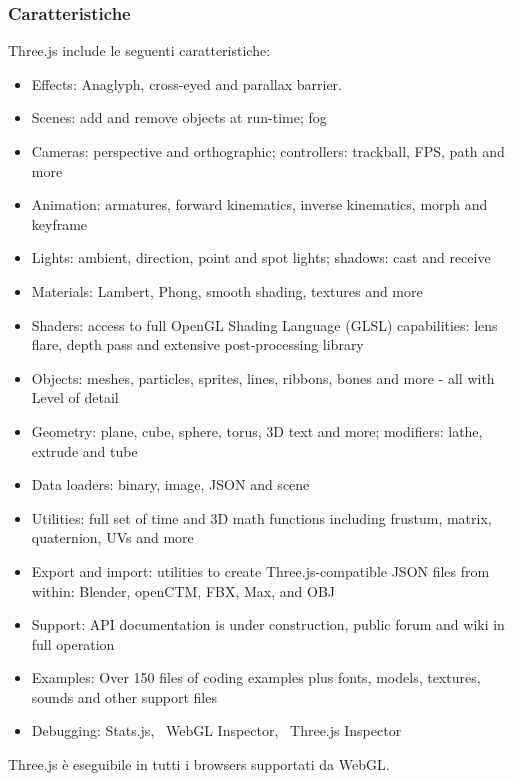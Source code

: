 
\subsubsection{Caratteristiche}
Three.js include le seguenti caratteristiche:~\cite{mrdoob}
\begin{itemize}

\item Effects: Anaglyph, cross-eyed and parallax barrier.
\item Scenes: add and remove objects at run-time; fog
\item Cameras: perspective and orthographic; controllers: trackball, FPS, path and more
\item Animation: armatures, forward kinematics, inverse kinematics, morph and keyframe
\item Lights: ambient, direction, point and spot lights; shadows: cast and receive
\item Materials: Lambert, Phong, smooth shading, textures and more
\item Shaders: access to full OpenGL Shading Language (GLSL) capabilities: lens flare, depth pass and extensive post-processing library
\item Objects: meshes, particles, sprites, lines, ribbons, bones and more - all with Level of detail
\item Geometry: plane, cube, sphere, torus, 3D text and more; modifiers: lathe, extrude and tube
\item Data loaders: binary, image, JSON and scene
\item Utilities: full set of time and 3D math functions including frustum, matrix, quaternion, UVs and more
\item Export and import: utilities to create Three.js-compatible JSON files from within: Blender, openCTM, FBX, Max, and OBJ
\item Support: API documentation is under construction, public forum and wiki in full operation
\item Examples: Over 150 files of coding examples plus fonts, models, textures, sounds and other support files
\item Debugging: Stats.js,~\cite{stats.js} WebGL Inspector,~\cite{webglinspector} Three.js Inspector~\cite{threejsinspector}
\end{itemize}

Three.js è eseguibile in tutti i browsers supportati da WebGL.
